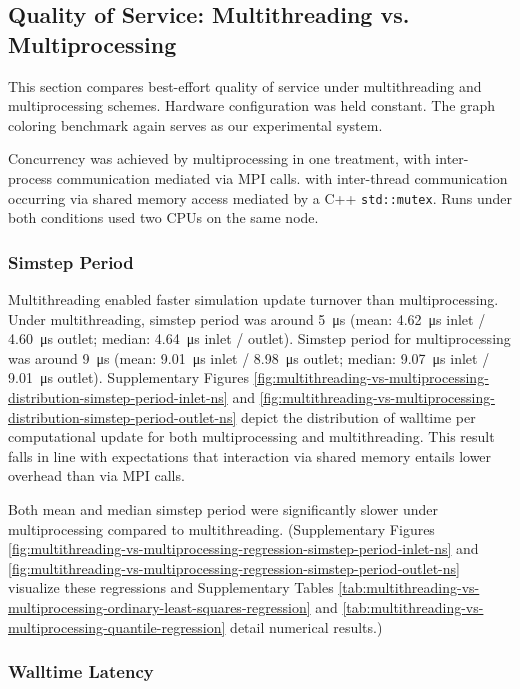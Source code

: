 \subsection{Quality of Service: Multithreading vs. Multiprocessing}

This section compares best-effort quality of service under multithreading and multiprocessing schemes.
Hardware configuration was held constant.
The graph coloring benchmark again serves as our experimental system.

Concurrency was achieved by multiprocessing in one treatment, with inter-process communication mediated via MPI calls.
with inter-thread communication occurring via shared memory access mediated by a C++ \texttt{std::mutex}.
Runs under both conditions used two CPUs on the same node.

\subsubsection{Simstep Period}

Multithreading enabled faster simulation update turnover than multiprocessing.
Under multithreading, simstep period was around \SI{5}{\micro\second} (mean: \SI{4.62}{\micro\second} inlet / \SI{4.60}{\micro\second} outlet; median: \SI{4.64}{\micro\second} inlet / outlet).
Simstep period for multiprocessing was around \SI{9}{\micro\second} (mean: \SI{9.01}{\micro\second} inlet / \SI{8.98}{\micro\second} outlet; median: \SI{9.07}{\micro\second} inlet / \SI{9.01}{\micro\second} outlet).
Supplementary Figures \ref{fig:multithreading-vs-multiprocessing-distribution-simstep-period-inlet-ns} and \ref{fig:multithreading-vs-multiprocessing-distribution-simstep-period-outlet-ns} depict the distribution of walltime per computational update for both multiprocessing and multithreading.
This result falls in line with expectations that interaction via shared memory entails lower overhead than via MPI calls.

Both mean and median simstep period were significantly slower under multiprocessing compared to multithreading.
(Supplementary Figures \ref{fig:multithreading-vs-multiprocessing-regression-simstep-period-inlet-ns} and \ref{fig:multithreading-vs-multiprocessing-regression-simstep-period-outlet-ns} visualize these regressions and Supplementary Tables \ref{tab:multithreading-vs-multiprocessing-ordinary-least-squares-regression} and \ref{tab:multithreading-vs-multiprocessing-quantile-regression} detail numerical results.)

\subsubsection{Walltime Latency}

